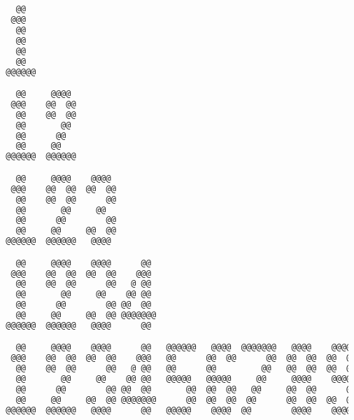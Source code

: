 \documentclass{article}
\begin{document}
	\begin{lstlisting}[basicstyle=\fontsize{7}{9}\ttfamily, language=bash]%[basicstyle=\tiny, %or \small or \footnotesize etc.]


    @@
   @@@
    @@
    @@
    @@
    @@
  @@@@@@

    @@     @@@@
   @@@    @@  @@
    @@    @@  @@
    @@       @@
    @@      @@
    @@     @@
  @@@@@@  @@@@@@

    @@     @@@@    @@@@
   @@@    @@  @@  @@  @@
    @@    @@  @@      @@
    @@       @@     @@
    @@      @@        @@
    @@     @@     @@  @@
  @@@@@@  @@@@@@   @@@@

    @@     @@@@    @@@@      @@
   @@@    @@  @@  @@  @@    @@@
    @@    @@  @@      @@   @ @@
    @@       @@     @@    @@ @@
    @@      @@        @@ @@  @@
    @@     @@     @@  @@ @@@@@@@
  @@@@@@  @@@@@@   @@@@      @@

    @@     @@@@    @@@@      @@   @@@@@@   @@@@  @@@@@@@   @@@@    @@@@   @@@@@
   @@@    @@  @@  @@  @@    @@@   @@      @@  @@      @@  @@  @@  @@  @@ @@   @@
    @@    @@  @@      @@   @ @@   @@      @@         @@   @@  @@  @@  @@ @@   @@
    @@       @@     @@    @@ @@   @@@@@   @@@@@     @@     @@@@    @@@@@ @@   @@
    @@      @@        @@ @@  @@       @@  @@  @@   @@     @@  @@      @@ @@   @@
    @@     @@     @@  @@ @@@@@@@      @@  @@  @@  @@      @@  @@  @@  @@ @@   @@
  @@@@@@  @@@@@@   @@@@      @@   @@@@@    @@@@  @@        @@@@    @@@@   @@@@@	 
	\end{lstlisting}
	
	
\paragraph{}\
\paragraph{}\
\paragraph{}\
\paragraph{}\
\paragraph{}\
\end{document}
